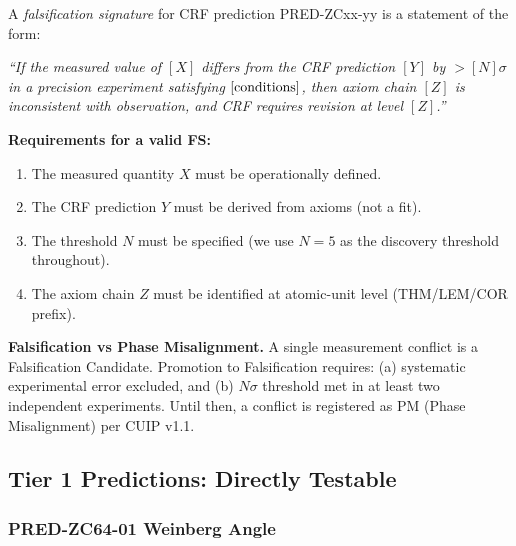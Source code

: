 \documentclass[12pt, a4paper]{article}
\begin{document}
\begin{formalbox}[title={DEF-ZC64-02: Falsification Signature (FS)}]
A \emph{falsification signature} for CRF prediction PRED-ZCxx-yy
is a statement of the form:

\medskip
\begin{center}
\textit{``If the measured value of $[X]$ differs from the
CRF prediction $[Y]$ by $> [N]\sigma$
in a precision experiment satisfying $[{\rm conditions}]$,
then axiom chain $[Z]$ is inconsistent with observation,
and CRF requires revision at level $[Z]$.''}
\end{center}

\medskip
\textbf{Requirements for a valid FS:}
\begin{enumerate}[leftmargin=2em, noitemsep]
  \item The measured quantity $X$ must be operationally defined.
  \item The CRF prediction $Y$ must be derived from axioms
    (not a fit).
  \item The threshold $N$ must be specified (we use $N=5$
    as the discovery threshold throughout).
  \item The axiom chain $Z$ must be identified at atomic-unit
    level (THM/LEM/COR prefix).
\end{enumerate}

\textbf{Falsification vs Phase Misalignment.}
A single measurement conflict is a Falsification Candidate.
Promotion to Falsification requires:
(a) systematic experimental error excluded, and
(b) $N\sigma$ threshold met in at least two independent
experiments.
Until then, a conflict is registered as PM (Phase Misalignment)
per CUIP v1.1.
\end{formalbox}

\subsection{Tier 1 Predictions: Directly Testable}
\label{sec:tier1}

\subsubsection{PRED-ZC64-01 \quad Weinberg Angle}
\label{sec:pred01}
\end{document}
